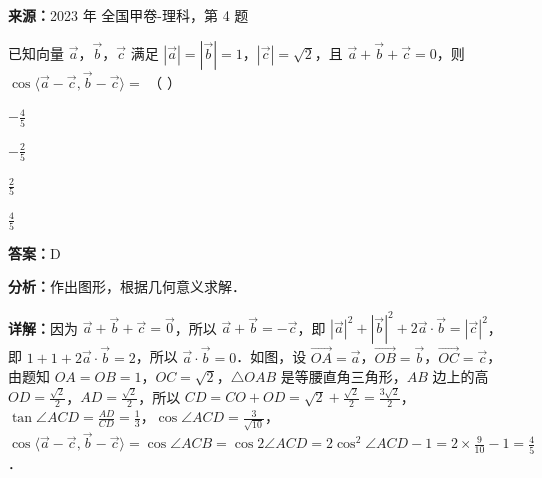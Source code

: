 \begin{question}[points=5]
\textbf{来源：}2023 年 全国甲卷-理科，第 4 题\par
已知向量 $\vec{a}$，$\vec{b}$，$\vec{c}$ 满足 $|\vec{a}| = |\vec{b}| = 1$，$|\vec{c}| = \sqrt{2}$，且 $\vec{a} + \vec{b} + \vec{c} = 0$，则 $\cos\langle \vec{a} - \vec{c}, \vec{b} - \vec{c} \rangle = $ （               ）
\begin{choices}
  \item $-\frac{4}{5}$
  \item $-\frac{2}{5}$
  \item $\frac{2}{5}$
  \item $\frac{4}{5}$
\end{choices}
\begin{solution}
\textbf{答案：}D

\textbf{分析：}作出图形，根据几何意义求解．

\textbf{详解：}因为 $\vec{a} + \vec{b} + \vec{c} = \vec{0}$，所以 $\vec{a} + \vec{b} = -\vec{c}$，即 $|\vec{a}|^2 + |\vec{b}|^2 + 2\vec{a} \cdot \vec{b} = |\vec{c}|^2$，即 $1 + 1 + 2\vec{a} \cdot \vec{b} = 2$，所以 $\vec{a} \cdot \vec{b} = 0$．如图，设 $\overrightarrow{OA} = \vec{a}$，$\overrightarrow{OB} = \vec{b}$，$\overrightarrow{OC} = \vec{c}$，由题知 $OA = OB = 1$，$OC = \sqrt{2}$，$\triangle OAB$ 是等腰直角三角形，$AB$ 边上的高 $OD = \frac{\sqrt{2}}{2}$，$AD = \frac{\sqrt{2}}{2}$，所以 $CD = CO + OD = \sqrt{2} + \frac{\sqrt{2}}{2} = \frac{3\sqrt{2}}{2}$，$\tan \angle ACD = \frac{AD}{CD} = \frac{1}{3}$，$\cos \angle ACD = \frac{3}{\sqrt{10}}$，$\cos\langle \vec{a} - \vec{c}, \vec{b} - \vec{c} \rangle = \cos \angle ACB = \cos 2\angle ACD = 2\cos^2 \angle ACD - 1 = 2 \times \frac{9}{10} - 1 = \frac{4}{5}$．
\end{solution}
\end{question}

